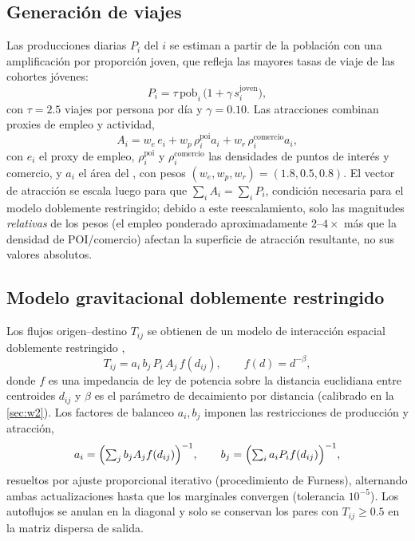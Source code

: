 \subsection{Generación de viajes}
Las producciones diarias $P_i$ del \ageb $i$ se estiman a partir de la población con
una amplificación por proporción joven, que refleja las mayores tasas de viaje de
las cohortes jóvenes:
\begin{equation}
  P_i = \tau \, \mathrm{pob}_i \,\bigl(1 + \gamma\, s^{\text{joven}}_i\bigr),
  \label{eq:productions}
\end{equation}
con $\tau = \num{2.5}$ viajes por persona por día y $\gamma = \num{0.10}$. Las
atracciones combinan proxies de empleo y actividad,
\begin{equation}
  A_i = w_e\, e_i + w_p\, \rho^{\text{poi}}_i a_i + w_r\, \rho^{\text{comercio}}_i a_i,
  \label{eq:attractions}
\end{equation}
con $e_i$ el proxy de empleo, $\rho^{\text{poi}}_i$ y $\rho^{\text{comercio}}_i$ las
densidades de puntos de interés y comercio, y $a_i$ el área del \ageb, con pesos
$(w_e, w_p, w_r) = (\num{1.8}, \num{0.5}, \num{0.8})$. El vector de
atracción se escala luego para que $\sum_i A_i = \sum_i P_i$, condición necesaria
para el modelo doblemente restringido; debido a este reescalamiento, solo las
magnitudes \emph{relativas} de los pesos (el empleo ponderado aproximadamente
$2$--$4\times$ más que la densidad de POI/comercio) afectan la superficie de
atracción resultante, no sus valores absolutos.

\subsection{Modelo gravitacional doblemente restringido}
Los flujos origen--destino $T_{ij}$ se obtienen de un modelo de interacción espacial
doblemente restringido \parencite{wilson1971gravity},
\begin{equation}
  T_{ij} = a_i\, b_j\, P_i\, A_j\, f(d_{ij}), \qquad
  f(d) = d^{-\beta},
  \label{eq:gravity}
\end{equation}
donde $f$ es una impedancia de ley de potencia sobre la distancia euclidiana entre
centroides $d_{ij}$ y $\beta$ es el parámetro de decaimiento por distancia
(calibrado en la \cref{sec:w2}). Los factores de balanceo $a_i,b_j$ imponen las
restricciones de producción y atracción,
\begin{equation}
  a_i = \Bigl(\textstyle\sum_j b_j A_j f(d_{ij})\Bigr)^{-1}, \qquad
  b_j = \Bigl(\textstyle\sum_i a_i P_i f(d_{ij})\Bigr)^{-1},
  \label{eq:furness}
\end{equation}
resueltos por ajuste proporcional iterativo (procedimiento de Furness), alternando
ambas actualizaciones hasta que los marginales convergen (tolerancia $10^{-5}$). Los
autoflujos se anulan en la diagonal y solo se conservan los pares con
$T_{ij}\ge\num{0.5}$ en la matriz dispersa de salida.

